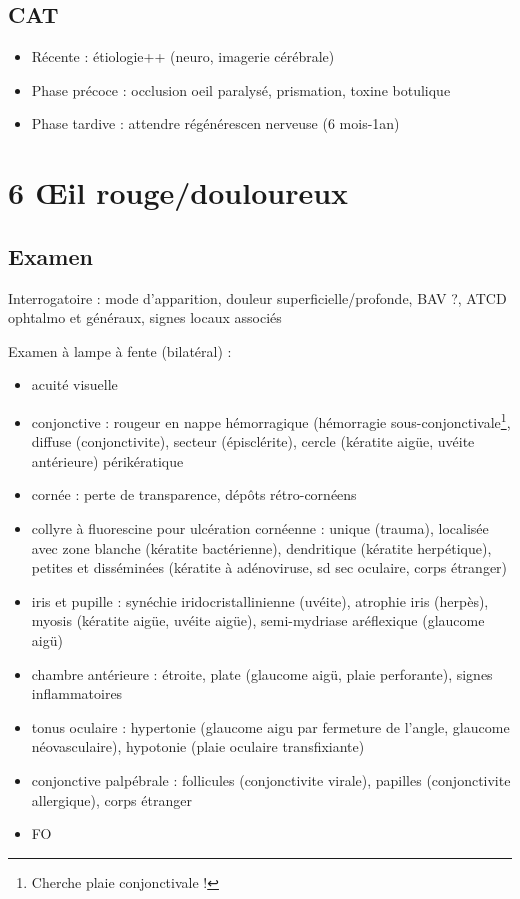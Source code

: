 \documentclass[11pt]{article}
\begin{document}
\subsection{CAT}
\label{sec:org8eab1ca}
\begin{itemize}
\item Récente : étiologie++ (neuro, imagerie cérébrale)
\item Phase précoce : occlusion oeil paralysé, prismation, toxine botulique
\item Phase tardive : attendre régénérescen nerveuse (6 mois-1an)
\end{itemize}
\section{6 \OE{}il rouge/douloureux}
\label{sec:org12b83bc}
\subsection{Examen}
\label{sec:orge3d3376}
Interrogatoire : mode d'apparition, douleur superficielle/profonde, BAV
   ?, ATCD ophtalmo et généraux, signes locaux associés

Examen à lampe à fente (bilatéral) :
\begin{itemize}
\item acuité visuelle
\item conjonctive : rougeur en nappe hémorragique (hémorragie
sous-conjonctivale\footnote{Cherche plaie conjonctivale !}, diffuse (conjonctivite), secteur (épisclérite),
cercle (kératite aigüe, uvéite antérieure)
périkératique
\item cornée : perte de transparence, dépôts rétro-cornéens
\item collyre à fluorescine pour ulcération cornéenne : unique (trauma), localisée
avec zone blanche (kératite bactérienne), dendritique (kératite herpétique),
petites et disséminées (kératite à adénoviruse, sd sec oculaire, corps
étranger)
\item iris et pupille : synéchie iridocristallinienne (uvéite), atrophie iris
(herpès), myosis (kératite aigüe, uvéite aigüe), semi-mydriase
aréflexique (glaucome aigü)
\item chambre antérieure : étroite, plate (glaucome aigü, plaie perforante), signes inflammatoires
\item tonus oculaire : hypertonie (glaucome aigu par fermeture de l'angle, glaucome
néovasculaire), hypotonie (plaie oculaire transfixiante)
\item conjonctive palpébrale : follicules (conjonctivite virale), papilles
(conjonctivite allergique), corps étranger
\item FO
\end{itemize}
\end{document}

